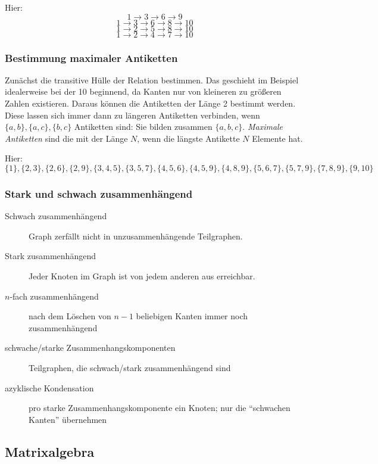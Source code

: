 Hier:
\[1 \rightarrow 3 \rightarrow 6 \rightarrow 9\]
\[1 \rightarrow 3 \rightarrow 6 \rightarrow 8 \rightarrow 10\]
\[1 \rightarrow 2 \rightarrow 5 \rightarrow 8 \rightarrow 10\]
\[1 \rightarrow 2 \rightarrow 4 \rightarrow 7 \rightarrow 10\]


\subsubsection{Bestimmung maximaler Antiketten}
Zunächst die transitive Hülle der Relation bestimmen. Das geschieht im Beispiel idealerweise
bei der 10 beginnend, da Kanten nur von kleineren zu größeren Zahlen existieren. Daraus können
die Antiketten der Länge 2 bestimmt werden. Diese lassen sich immer dann zu längeren Antiketten
verbinden, wenn $\{a,b\}, \{a,c\}, \{b, c\}$ Antiketten sind: Sie bilden zusammen $\{a,b,c\}$.
\textit{Maximale Antiketten} sind die mit der Länge $N$, wenn die längste Antikette $N$
Elemente hat.

Hier:
\[\{1\}, \{2,3\}, \{2,6\}, \{2,9\}, \{3, 4,5\}, \{3, 5, 7\}, \{4, 5, 6\}, \{4,5,9\}, \{4,8,9\},
\{5,6,7\},\{5,7,9\}, \{7,8,9\}, \{9,10\}\]


\subsubsection{Stark und schwach zusammenhängend}
\begin{description}
    \item[Schwach zusammenhängend] Graph zerfällt nicht in unzusammenhängende Teilgraphen.
    \item[Stark zusammenhängend] Jeder Knoten im Graph ist von jedem anderen aus erreichbar.
    \item[$n$-fach zusammenhängend] nach dem Löschen von $n−1$ beliebigen Kanten immer noch zusammenhängend
    \item[schwache/starke Zusammenhangskomponenten] Teilgraphen, die schwach/stark zusammenhängend sind
    \item[azyklische Kondensation] pro starke Zusammenhangskomponente ein Knoten; nur die ``schwachen Kanten'' übernehmen
\end{description}

\subsection{Matrixalgebra}
\label{sec:math:i}

